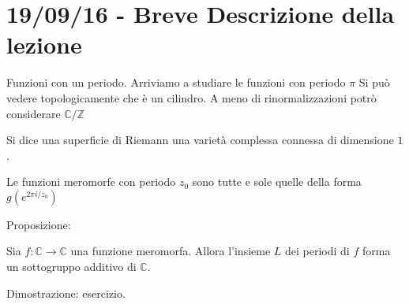 \chapter{19/09/16 - Breve Descrizione della lezione}


Funzioni con un periodo.
Arriviamo a studiare le funzioni con periodo $\pi$
Si può vedere topologicamente che è un cilindro. A meno di rinormalizzazioni potrò
considerare $\mathbb{C}/\mathbb{Z}$

\begin{definizione}
Si dice una superficie di Riemann una varietà complessa connessa di dimensione $1$.
\end{definizione}

\begin{proposizione}
Le funzioni meromorfe con periodo $z_0$ sono tutte e sole quelle della forma $g\left(e^{2\pi i/z_0}\right)$
\end{proposizione}


Proposizione:

Sia $f: \mathbb{C}\rightarrow\mathbb{C}$ una funzione meromorfa. Allora l'insieme $L$ dei periodi di $f$
forma un sottogruppo additivo di $\mathbb{C}$.

Dimostrazione: esercizio.

